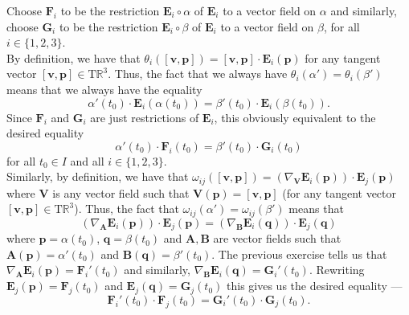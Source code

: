 \documentclass[12 pt, letterpaper]{hmcpset}
\begin{document}
\begin{solution}
	Choose $\mathbf{F}_{i}$ to be the restriction $\mathbf{E}_{i} \circ \alpha$ of $\mathbf{E}_{i}$ to a vector field on $\alpha$ and similarly, choose $\mathbf{G}_{i}$ to be the restriction $\mathbf{E}_{i} \circ \beta$ of $\mathbf{E}_{i}$ to a vector field on $\beta$, for all $i \in \{ 1, 2, 3 \}$. \\

	By definition, we have that $\theta_{i}([\mathbf{v}, \mathbf{p}]) = [\mathbf{v}, \mathbf{p}] \cdot \mathbf{E}_{i}(\mathbf{p})$ for any tangent vector $[\mathbf{v}, \mathbf{p}] \in \mathrm{T}\mathbb{R}^{3}$. Thus, the fact that we always have $\theta_{i}(\alpha') = \theta_{i}(\beta')$ means that we always have the equality
	\[
		\alpha'(t_{0}) \cdot \mathbf{E}_{i}(\alpha(t_{0})) = \beta'(t_{0}) \cdot \mathbf{E}_{i}(\beta(t_{0})).
	\]
	Since $\mathbf{F}_{i}$ and $\mathbf{G}_{i}$ are just restrictions of $\mathbf{E}_{i}$, this obviously equivalent to the desired equality
	\[
		\alpha'(t_{0}) \cdot \mathbf{F}_{i}(t_{0}) = \beta'(t_{0}) \cdot \mathbf{G}_{i}(t_{0})
	\]
	for all $t_{0} \in I$ and all $i \in \{ 1, 2, 3 \}$. \\

	Similarly, by definition, we have that $\omega_{ij}([\mathbf{v}, \mathbf{p}]) = (\nabla_{\mathbf{V}} \mathbf{E}_{i}(\mathbf{p})) \cdot \mathbf{E}_{j}(\mathbf{p})$ where $\mathbf{V}$ is any vector field such that $\mathbf{V}(\mathbf{p}) = [\mathbf{v}, \mathbf{p}]$ (for any tangent vector $[\mathbf{v}, \mathbf{p}] \in \mathrm{T}\mathbb{R}^{3}$). Thus, the fact that $\omega_{ij}(\alpha') = \omega_{ij}(\beta')$ means that
	\[
		(\nabla_{\mathbf{A}} \mathbf{E}_{i}(\mathbf{p})) \cdot \mathbf{E}_{j}(\mathbf{p}) = (\nabla_{\mathbf{B}} \mathbf{E}_{i}(\mathbf{q})) \cdot \mathbf{E}_{j}(\mathbf{q})
	\]
	where $\mathbf{p} = \alpha(t_{0})$, $\mathbf{q} = \beta(t_{0})$ and $\mathbf{A}, \mathbf{B}$ are vector fields such that $\mathbf{A}(\mathbf{p}) = \alpha'(t_{0})$ and $\mathbf{B}(\mathbf{q}) = \beta'(t_{0})$. The previous exercise tells us that $\nabla_{\mathbf{A}} \mathbf{E}_{i}(\mathbf{p}) = \mathbf{F}_{i}'(t_{0})$ and similarly, $\nabla_{\mathbf{B}} \mathbf{E}_{i}(\mathbf{q}) = \mathbf{G}_{i}'(t_{0})$. Rewriting $\mathbf{E}_{j}(\mathbf{p}) = \mathbf{F}_{j}(t_{0})$ and $\mathbf{E}_{j}(\mathbf{q}) = \mathbf{G}_{j}(t_{0})$ this gives us the desired equality ---
	\[
		\mathbf{F}_{i}'(t_{0}) \cdot \mathbf{F}_{j}(t_{0}) = \mathbf{G}_{i}'(t_{0}) \cdot \mathbf{G}_{j}(t_{0}).
	\]
\end{solution}
\end{document}
